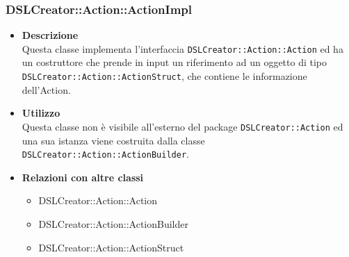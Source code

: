  \subsubsection{DSLCreator::Action::ActionImpl}
                    \begin{itemize}
                        \item \textbf{Descrizione} \hfill \\
                          Questa classe implementa l'interfaccia \texttt{DSLCreator::Action::Action} ed ha un costruttore che prende in input un riferimento ad un oggetto di tipo \texttt{DSLCrea\-tor::Action::ActionStruct}, che contiene le informazione dell'Action.
                        \item \textbf{Utilizzo} \hfill \\
                          Questa classe non è visibile all'esterno del package \texttt{DSLCreator::Action} ed una sua istanza viene costruita dalla classe \texttt{DSLCreator::Action::ActionBuilder}.
                        \item \textbf{Relazioni con altre classi}
                            \begin{itemize}
                              \item DSLCreator::Action::Action
                              \item DSLCreator::Action::ActionBuilder
                              \item DSLCreator::Action::ActionStruct
                            \end{itemize}
                    \end{itemize}  

